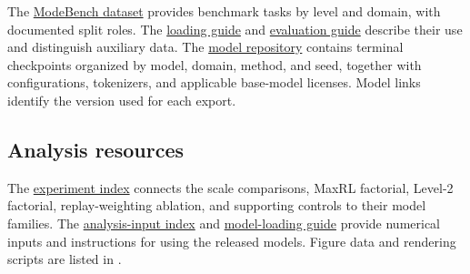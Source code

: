 The \href{https://huggingface.co/datasets/od2961/ModeBench}{ModeBench dataset}
provides benchmark tasks by level and domain, with documented split
roles. The
\href{https://huggingface.co/datasets/od2961/ModeBench\#loading}{loading guide}
and \href{https://huggingface.co/datasets/od2961/ModeBench\#evaluation}{evaluation guide}
describe their use and distinguish auxiliary data.
The \href{https://huggingface.co/od2961/maxent-grpo-models}{model repository}
contains terminal checkpoints organized by model, domain, method, and
seed, together with configurations, tokenizers, and applicable base-model
licenses. Model links identify the version used for each export.

\subsection{Analysis resources}
\label{app:repro-recovery}

The \href{https://huggingface.co/od2961/maxent-grpo-models/blob/main/EXPERIMENTS.md}{experiment index}
connects the scale comparisons, MaxRL factorial, Level-2 factorial,
replay-weighting ablation, and supporting controls to their model families.
The \href{https://huggingface.co/od2961/maxent-grpo-models/blob/main/DATA.md}{analysis-input index}
and \href{https://huggingface.co/od2961/maxent-grpo-models/blob/main/RESTORE.md}{model-loading guide}
provide numerical inputs and instructions for using the released models.
Figure data and rendering scripts are listed in
\mbox{}.

